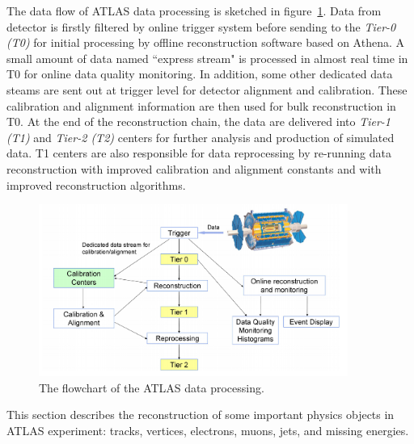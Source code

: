 The data flow of ATLAS data processing is sketched in figure~\ref{fig:data_processing}\cite{Boyd_2010}. 
Data from detector is firstly filtered by online trigger system before sending to the \textit{Tier-0 (T0)} for initial processing by offline reconstruction software based on Athena.
A small amount of data named ``express stream" is processed in almost real time in T0 for online data quality monitoring.
In addition, some other dedicated data steams are sent out at trigger level for detector alignment and calibration.
These calibration and alignment information are then used for bulk reconstruction in T0.
At the end of the reconstruction chain, the data are delivered into \textit{Tier-1 (T1)} and \textit{Tier-2 (T2)} centers for further analysis and production of simulated data.
T1 centers are also responsible for data reprocessing by re-running data reconstruction with improved calibration and alignment constants and with improved reconstruction algorithms.
\begin{figure}[!htb]
  \centering
  \includegraphics[width=0.9\textwidth]{figures/Simulation/data_processing.png}
  \caption{The flowchart of the ATLAS data processing.}
  \label{fig:data_processing}
\end{figure}

This section describes the reconstruction of some important physics objects in ATLAS experiment: tracks, vertices, electrons, muons, jets, and missing energies.







